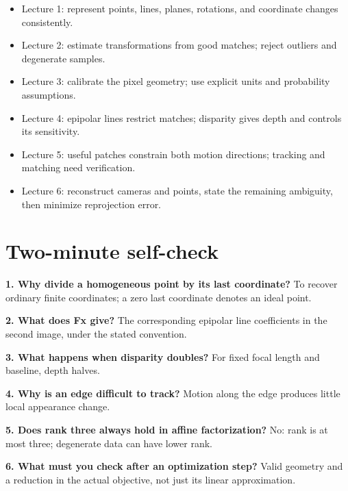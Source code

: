 \documentclass[11pt,letterpaper]{article}
\begin{document}
\begin{itemize}
\item Lecture 1: represent points, lines, planes, rotations, and coordinate changes consistently.
\item Lecture 2: estimate transformations from good matches; reject outliers and degenerate samples.
\item Lecture 3: calibrate the pixel geometry; use explicit units and probability assumptions.
\item Lecture 4: epipolar lines restrict matches; disparity gives depth and controls its sensitivity.
\item Lecture 5: useful patches constrain both motion directions; tracking and matching need verification.
\item Lecture 6: reconstruct cameras and points, state the remaining ambiguity, then minimize reprojection error.
\end{itemize}


\section*{Two-minute self-check}


\textbf{1. Why divide a homogeneous point by its last coordinate?} To recover ordinary finite coordinates; a zero last coordinate denotes an ideal point.



\textbf{2. What does Fx give?} The corresponding epipolar line coefficients in the second image, under the stated convention.



\textbf{3. What happens when disparity doubles?} For fixed focal length and baseline, depth halves.



\textbf{4. Why is an edge difficult to track?} Motion along the edge produces little local appearance change.



\textbf{5. Does rank three always hold in affine factorization?} No: rank is at most three; degenerate data can have lower rank.



\textbf{6. What must you check after an optimization step?} Valid geometry and a reduction in the actual objective, not just its linear approximation.
\end{document}
